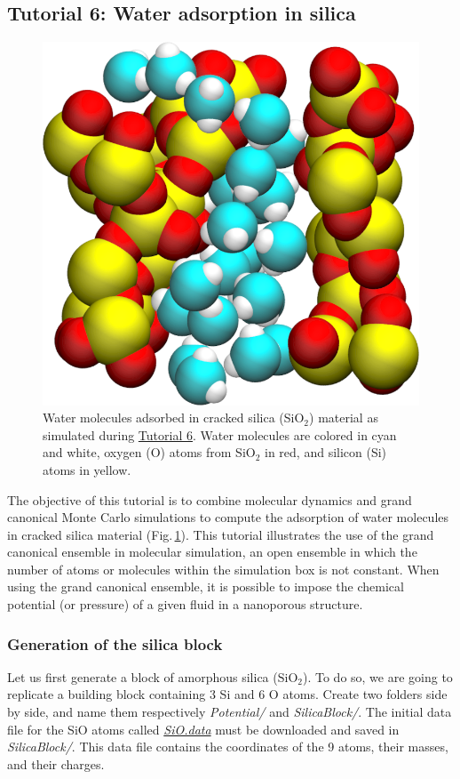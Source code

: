 \documentclass[9pt,tutorial]{livecoms}
\begin{document}
\subsection{Tutorial 6: Water adsorption in silica}
\label{gcmc-silica-label}

\begin{figure}
\centering
\includegraphics[width=0.55\linewidth]{GCMC}
\caption{Water molecules adsorbed in cracked silica (SiO$_2$) material as simulated
during \hyperref[gcmc-silica-label]{Tutorial 6}. Water molecules are colored in
cyan and white, oxygen (O) atoms from SiO$_2$ in red, and silicon (Si) atoms in yellow.}
\label{fig:GCMC}
\end{figure}

\noindent The objective of this tutorial is to combine molecular dynamics and
grand canonical Monte Carlo simulations to compute the adsorption of water
molecules in cracked silica material (Fig.\,\ref{fig:GCMC}). This tutorial
illustrates the use of the grand canonical ensemble in molecular simulation, an
open ensemble in which the number of atoms or molecules within the simulation
box is not constant. When using the grand canonical ensemble, it is possible to
impose the chemical potential (or pressure) of a given fluid in a nanoporous structure.

\subsubsection{Generation of the silica block}
\noindent Let us first generate a block of amorphous silica ($\text{SiO}_2$).
To do so, we are going to replicate a building block containing 3 Si and 6 O atoms.
Create two folders side by side, and name them respectively \textit{Potential/}
and \textit{SilicaBlock/}. The initial data file for the SiO atoms called
\href{https://raw.githubusercontent.com/lammpstutorials/lammpstutorials-article/main/files/tutorial6/SiO.data}{\textit{SiO.data}}
must be downloaded and saved in \textit{SilicaBlock/}. This data file contains
the coordinates of the 9 atoms, their masses, and their charges.
\end{document}
